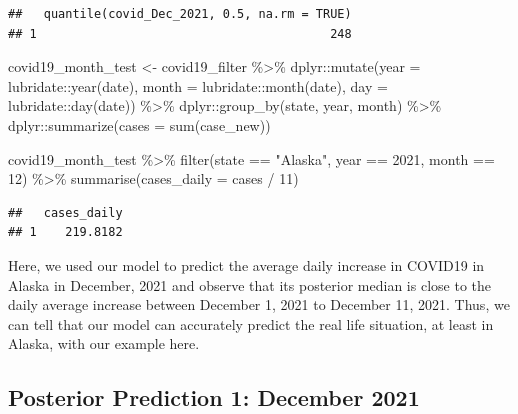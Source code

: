 \documentclass[
]{book}
\newenvironment{Shaded}{\begin{snugshade}}{\end{snugshade}}
\newcommand{\AttributeTok}[1]{\textcolor[rgb]{0.77,0.63,0.00}{#1}}
\newcommand{\DecValTok}[1]{\textcolor[rgb]{0.00,0.00,0.81}{#1}}
\newcommand{\FunctionTok}[1]{\textcolor[rgb]{0.00,0.00,0.00}{#1}}
\newcommand{\NormalTok}[1]{#1}
\newcommand{\OtherTok}[1]{\textcolor[rgb]{0.56,0.35,0.01}{#1}}
\newcommand{\SpecialCharTok}[1]{\textcolor[rgb]{0.00,0.00,0.00}{#1}}
\newcommand{\StringTok}[1]{\textcolor[rgb]{0.31,0.60,0.02}{#1}}
\begin{document}
\begin{verbatim}
##   quantile(covid_Dec_2021, 0.5, na.rm = TRUE)
## 1                                         248
\end{verbatim}

\begin{Shaded}
\begin{Highlighting}[]
\NormalTok{covid19\_month\_test }\OtherTok{\textless{}{-}}\NormalTok{ covid19\_filter }\SpecialCharTok{\%\textgreater{}\%}
\NormalTok{  dplyr}\SpecialCharTok{::}\FunctionTok{mutate}\NormalTok{(}\AttributeTok{year =}\NormalTok{ lubridate}\SpecialCharTok{::}\FunctionTok{year}\NormalTok{(date), }
                \AttributeTok{month =}\NormalTok{ lubridate}\SpecialCharTok{::}\FunctionTok{month}\NormalTok{(date), }
                \AttributeTok{day =}\NormalTok{ lubridate}\SpecialCharTok{::}\FunctionTok{day}\NormalTok{(date)) }\SpecialCharTok{\%\textgreater{}\%}
\NormalTok{  dplyr}\SpecialCharTok{::}\FunctionTok{group\_by}\NormalTok{(state, year, month) }\SpecialCharTok{\%\textgreater{}\%}
\NormalTok{  dplyr}\SpecialCharTok{::}\FunctionTok{summarize}\NormalTok{(}\AttributeTok{cases =} \FunctionTok{sum}\NormalTok{(case\_new)) }

\NormalTok{covid19\_month\_test }\SpecialCharTok{\%\textgreater{}\%} 
  \FunctionTok{filter}\NormalTok{(state }\SpecialCharTok{==} \StringTok{"Alaska"}\NormalTok{, year }\SpecialCharTok{==} \DecValTok{2021}\NormalTok{, month }\SpecialCharTok{==} \DecValTok{12}\NormalTok{) }\SpecialCharTok{\%\textgreater{}\%}
  \FunctionTok{summarise}\NormalTok{(}\AttributeTok{cases\_daily =}\NormalTok{ cases }\SpecialCharTok{/} \DecValTok{11}\NormalTok{)}
\end{Highlighting}
\end{Shaded}

\begin{verbatim}
##   cases_daily
## 1    219.8182
\end{verbatim}

Here, we used our model to predict the average daily increase in COVID19 in Alaska in December, 2021 and observe that its posterior median is close to the daily average increase between December 1, 2021 to December 11, 2021. Thus, we can tell that our model can accurately predict the real life situation, at least in Alaska, with our example here.

\hypertarget{posterior-prediction-1-december-2021}{%
\subsection{Posterior Prediction 1: December 2021}\label{posterior-prediction-1-december-2021}}
\end{document}
